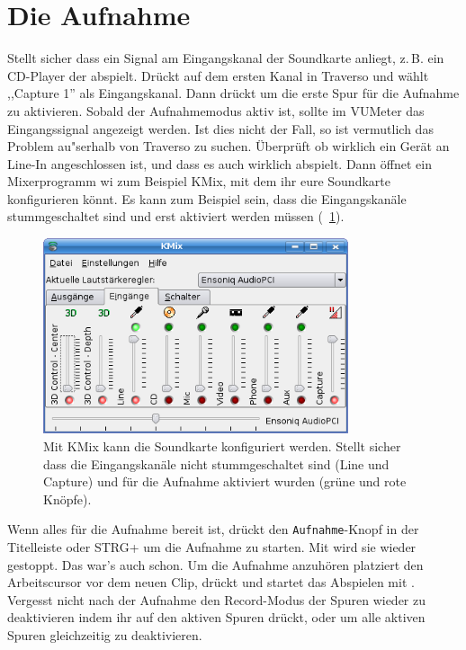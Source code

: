 \section{Die Aufnahme}
Stellt sicher dass ein Signal am Eingangskanal der Soundkarte anliegt, z.\,B. ein CD-Player der abspielt. Drückt  auf dem ersten Kanal in Traverso und wählt ,,Capture 1'' als Eingangskanal. Dann drückt  um die erste Spur für die Aufnahme zu aktivieren. Sobald der Aufnahmemodus aktiv ist, sollte im VUMeter das Eingangssignal angezeigt werden. Ist dies nicht der Fall, so ist vermutlich das Problem au"serhalb von Traverso zu suchen. Überprüft ob wirklich ein Gerät an Line-In angeschlossen ist, und dass es auch wirklich abspielt. Dann öffnet ein Mixerprogramm wi zum Beispiel KMix, mit dem ihr eure Soundkarte konfigurieren könnt. Es kann zum Beispiel sein, dass die Eingangskanäle stummgeschaltet sind und erst aktiviert werden müssen (\FigB\ \ref{fig_kmix01}).

\begin{figure}
 \centering\includegraphics[width=0.8\textwidth]{images/kmix01.png}
 \caption{Mit KMix kann die Soundkarte konfiguriert werden. Stellt sicher dass die Eingangskanäle nicht stummgeschaltet sind (Line und Capture) und für die Aufnahme aktiviert wurden (grüne und rote Knöpfe).}
 \label{fig_kmix01}
\end{figure}

Wenn alles für die Aufnahme bereit ist, drückt den \texttt{Aufnahme}-Knopf in der Titelleiste oder STRG+ um die Aufnahme zu starten. Mit  wird sie wieder gestoppt. Das war's auch schon. Um die Aufnahme anzuhören platziert den Arbeitscursor vor dem neuen Clip, drückt  und startet das Abspielen mit . Vergesst nicht nach der Aufnahme den Record-Modus der Spuren wieder zu deaktivieren indem ihr  auf den aktiven Spuren drückt, oder  um alle aktiven Spuren gleichzeitig zu deaktivieren.
